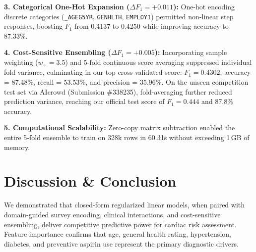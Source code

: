 \documentclass[10pt,conference,compsocconf]{IEEEtran}
\begin{document}
\textbf{3. Categorical One-Hot Expansion ($\Delta F_1 = +0.011$):} One-hot encoding discrete categories (\texttt{\_AGEG5YR}, \texttt{GENHLTH}, \texttt{EMPLOY1}) permitted non-linear step responses, boosting $F_1$ from 0.4137 to 0.4250 while improving accuracy to 87.33\%.

\textbf{4. Cost-Sensitive Ensembling ($\Delta F_1 = +0.005$):} Incorporating sample weighting ($w_+ = 3.5$) and 5-fold continuous score averaging suppressed individual fold variance, culminating in our top cross-validated score: $F_1 = 0.4302$, accuracy = 87.48\%, recall = 53.53\%, and precision = 35.96\%. On the unseen competition test set via AIcrowd (Submission \#338235), fold-averaging further reduced prediction variance, reaching our official test score of $F_1 = 0.444$ and 87.8\% accuracy.

\textbf{5. Computational Scalability:} Zero-copy matrix subtraction enabled the entire 5-fold ensemble to train on 328k rows in 60.31s without exceeding 1\,GB of memory.

\section{Discussion \& Conclusion}
\label{sec:discussion}
We demonstrated that closed-form regularized linear models, when paired with domain-guided survey encoding, clinical interactions, and cost-sensitive ensembling, deliver competitive predictive power for cardiac risk assessment. Feature importance confirms that age, general health rating, hypertension, diabetes, and preventive aspirin use represent the primary diagnostic drivers.

\newpage


\end{document}
